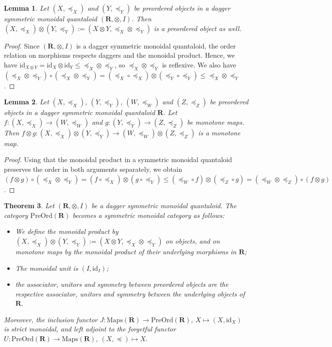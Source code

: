 \documentclass[12pt]{tac}
\newtheorem{theorem}{Theorem}[section]
\newtheorem{lemma}[theorem]{Lemma}
\theoremstyle{definition}
\theoremstyle{remark}
\newcommand{\qo}{{\boldsymbol{\preccurlyeq}}}
\newcommand{\<}{\langle}
\renewcommand{\>}{\rangle}
\renewcommand{\:}{\colon}
\newcommand{\id}{\mathrm{id}}
\begin{document}
\begin{lemma}\label{lem:monoidal product of preordered objects}
    Let $(X,\qo_X)$ and $(Y,\qo_Y)$ be preordered objects in a dagger symmetric monoidal quantaloid $(\mathbf R,\otimes,I)$. Then  $(X,\qo_X)\otimes(Y,\qo_Y):=(X\otimes Y,\qo_X\otimes \qo_Y)$ is a preordered object as well.
\end{lemma}
\begin{proof}
Since $(\mathbf R,\otimes,I)$ is a dagger symmetric monoidal  quantaloid, the order relation on morphisms respects daggers and the monoidal product. Hence, we have $\id_{X\otimes Y}=\id_X\otimes\id_Y\leq \qo_X\otimes\qo_Y$, so $\qo_X\otimes\qo_Y$ is reflexive. We also have $(\qo_X\otimes\qo_Y)\circ(\qo_X\otimes\qo_Y)=(\qo_X\circ\qo_X)\otimes(\qo_Y\circ\qo_Y)\leq \qo_X\otimes\qo_Y$. 
\end{proof}

\begin{lemma}\label{lem:monoidal product of monotone functions}
    Let $(X,\qo_X)$, $(Y,\qo_Y)$, $(W,\qo_W)$ and $(Z,\qo_Z)$ be preordered objects in a dagger symmetric monoidal quantaloid $\mathbf R$. Let $f:(X,\qo_X)\to (W,\qo_W)$ and $g:(Y,\qo_Y)\to (Z,\qo_Z)$ be monotone maps. Then $f\otimes g:(X,\qo_X)\otimes(Y,\qo_Y)\to (W,\qo_W)\otimes (Z,\qo_Z)$ is a monotone map.
\end{lemma}
\begin{proof}Using that the monoidal product in a symmetric monoidal quantaloid preserves the order in both arguments separately, we obtain
$(f\otimes g)\circ (\qo_X\otimes \qo_Y)=(f\circ\qo_X)\otimes(g\circ\qo_Y)\leq (\qo_W\circ f)\otimes(\qo_Z\circ g)=(\qo_W\otimes\qo_Z)\circ(f\otimes g)$.
\end{proof}


\begin{theorem}\label{thm:monoidal structure PreOrd}
Let $(\mathbf R,\otimes,I)$ be a dagger symmetric monoidal quantaloid. The category $\mathrm{PreOrd}(\mathbf R)$ becomes a symmetric monoidal category as follows:
\begin{itemize}
    \item We define the monoidal product by $(X,\qo_X)\otimes(Y,\qo_Y):=(X\otimes Y,\qo_X\otimes\qo_Y)$ on objects, and on monotone maps by the monoidal product of their underlying morphisms in $\mathbf R$;
    \item The monoidal unit is $(I, \id_I)$;
    \item the associator, unitors and symmetry between preordered objects are the respective associator, unitors and symmetry between the underlying objects of $\mathbf R$.
\end{itemize}   Moreover, the inclusion functor $J:\mathrm{Maps}(\mathbf R)\to\mathrm{PreOrd}(\mathbf{R})$, $X\mapsto (X,\id_X)$ is strict monoidal, and left adjoint to the forgetful functor $U:\mathrm{PreOrd}(\mathbf R)\to\mathrm{Maps}(\mathbf R)$, $(X,\qo)\mapsto X$.
\end{theorem}
\end{document}
